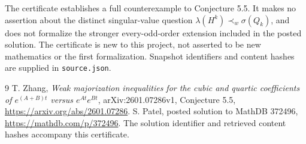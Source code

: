 \documentclass[11pt]{article}
\begin{document}
The certificate establishes a full counterexample to Conjecture 5.5. It makes no assertion about the distinct singular-value question $\lambda(H^k)\prec_w\sigma(Q_k)$, and does not formalize the stronger every-odd-order extension included in the posted solution. The certificate is new to this project, not asserted to be new mathematics or the first formalization. Snapshot identifiers and content hashes are supplied in \texttt{source.json}.
\begin{thebibliography}{9}
 T. Zhang, \emph{Weak majorization inequalities for the cubic and quartic coefficients of $e^{(A+B)t}$ versus $e^{At}e^{Bt}$}, arXiv:2601.07286v1, Conjecture 5.5, \url{https://arxiv.org/abs/2601.07286}.
 S. Patel, posted solution to MathDB 372496, \url{https://mathdb.com/p/372496}. The solution identifier and retrieved content hashes accompany this certificate.
\end{thebibliography}
\end{document}
